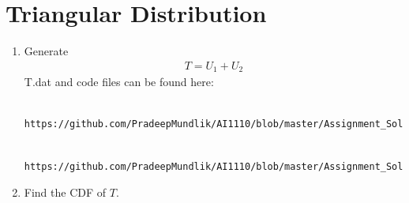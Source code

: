 \documentclass[journal,12pt,twocolumn]{IEEEtran}
\renewcommand\thesection{\arabic{section}}
\begin{document}
\section{Triangular Distribution}
\begin{enumerate}[label=\thesection.\arabic*
,ref=\thesection.\theenumi]
%
\item Generate 
	\begin{align}
		T = U_1+U_2
	\end{align}
\solution 
T.dat and code files can be found here:
\begin{lstlisting}
	https://github.com/PradeepMundlik/AI1110/blob/master/Assignment_Soln/codes/4/T.py
\end{lstlisting}
\begin{lstlisting}
	https://github.com/PradeepMundlik/AI1110/blob/master/Assignment_Soln/codes/4/T.dat
\end{lstlisting}
\item Find the CDF of $T$. \\
\solution


\end{enumerate}
\end{document}
